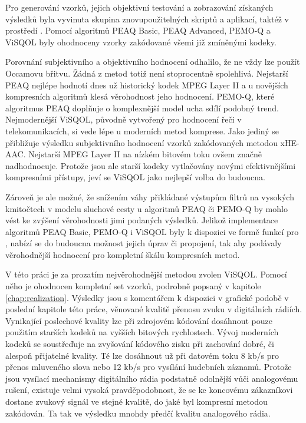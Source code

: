 Pro generování vzorků, jejich objektivní testování a zobrazování získaných výsledků byla vyvinuta skupina znovupoužitelných skriptů a aplikací, taktéž v prostředí \matlab. Pomocí algoritmů PEAQ Basic, PEAQ Advanced, PEMO-Q a ViSQOL byly ohodnoceny vzorky zakódované všemi již zmíněnými kodeky.

Porovnání subjektivního a objektivního hodnocení odhalilo, že ne vždy lze použít Occamovu břitvu. Žádná z metod totiž není stoprocentně spolehlivá. Nejstarší PEAQ nejlépe hodnotí dnes už historický kodek MPEG Layer II a u novějších kompresních algoritmů klesá věrohodnost jeho hodnocení. PEMO-Q, které algoritmus PEAQ doplňuje o komplexnější model ucha sdílí podobný trend. Nejmodernější ViSQOL, původně vytvořený pro hodnocení řeči v telekomunikacích, si vede lépe u moderních metod komprese. Jako jediný se přibližuje výsledku subjektivního hodnocení vzorků zakódovaných metodou xHE-AAC. Nejstarší MPEG Layer II na nízkém bitovém toku ovšem značně nadhodnocuje. Protože jsou ale starší kodeky vytlačovány novými efektivnějšími kompresními přístupy, jeví se ViSQOL jako nejlepší volba do budoucna.

Zároveň je ale možné, že snížením váhy přikládané výstupům filtrů na vysokých kmitočtech v modelu sluchové cesty u algoritmů PEAQ či PEMO-Q by mohlo vést ke zvýšení věrohodnosti jimi podaných výsledků. Jelikož implementace algoritmů PEAQ Basic, PEMO-Q i ViSQOL byly k dispozici ve formě funkcí pro \matlab, nabízí se do budoucna možnost jejich úprav či propojení, tak aby podávaly věrohodnější hodnocení pro kompletní škálu kompresních metod.

V této práci je za prozatím nejvěrohodnější metodou zvolen ViSQOL. Pomocí něho je ohodnocen kompletní set vzorků, podrobně popsaný v kapitole \ref{chap:realization}. Výsledky jsou s komentářem k dispozici v grafické podobě v poslední kapitole této práce, věnované kvalitě přenosu zvuku v digitálních rádiích. Vynikající poslechové kvality lze při zdrojovém kódování dosáhnout pouze použitím starších kodeků na vyšších bitových rychlostech. Vývoj moderních kodeků se soustřeďuje na zvyšování kódového zisku při zachování dobré, či alespoň přijatelné kvality. Té lze dosáhnout už při datovém toku 8 kb/s pro přenos mluveného slova nebo 12 kb/s pro vysílání hudebních záznamů. Protože jsou vysílací mechanismy digitálního rádia podstatně odolnější vůči analogovému rušení, existuje velmi vysoká pravděpodobnost, že se ke koncovému zákazníkovi dostane zvukový signál ve stejné kvalitě, do jaké byl kompresní metodou zakódován. Ta tak ve výsledku mnohdy předčí kvalitu analogového rádia.